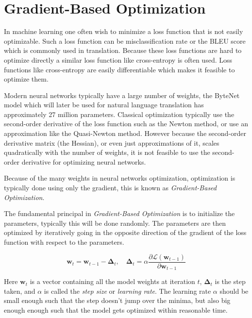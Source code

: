 \section{Gradient-Based Optimization}
\label{sec:theory:optimization}

In machine learning one often wish to minimize a loss function that is not easily optimizable. Such a loss function can be misclassification rate or the BLEU score which is commonly used in translation. Because these loss functions are hard to optimize directly a similar loss  function like cross-entropy is often used. Loss functions like cross-entropy are easily differentiable which makes it feasible to optimize them.

Modern neural networks typically have a large number of weights, the ByteNet model which will later be used for natural language translation has approximately 27 million parameters. Classical optimization typically use the second-order derivative of the loss function such as the Newton method, or use an approximation like the Quasi-Newton method. However because the second-order derivative matrix (the Hessian), or even just approximations of it, scales quadratically with the number of weights, it is not feasible to use the second-order derivative for optimizing neural networks.

Because of the many weights in neural networks optimization, optimization is typically done using only the gradient, this is known as \textit{Gradient-Based Optimization}.

The fundamental principal in \textit{Gradient-Based Optimization} is to initialize the parameters, typically this will be done randomly. The parameters are then optimized by iteratively going in the opposite direction of the gradient of the loss function with respect to the parameters.

\begin{equation}
\mathbf{w}_t = \mathbf{w}_{t-1} - {\boldsymbol\Delta}_t, \quad {\boldsymbol\Delta}_t = \alpha \frac{\partial \mathcal{L}(\mathbf{w}_{t-1})}{\partial \mathbf{w}_{t-1}}
\label{eq:theory:optimization:batch-optimization}
\end{equation}

Here $\mathbf{w}_t$ is a vector containing all the model weights at iteration $t$, ${\boldsymbol\Delta}_t$ is the step taken, and $\alpha$ is called the \textit{step size} or \textit{learning rate}. The learning rate $\alpha$ should be small enough such that the step doesn't jump over the minima, but also big enough enough such that the model gets optimized within reasonable time.

